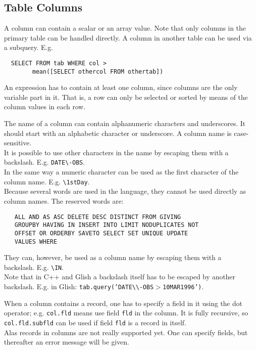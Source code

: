 \subsection{\label{TAQL:COLUMNS}Table Columns}
A column can contain a scalar or an array value.
Note that only columns in the primary table can be handled directly.
A column in another table can be used via a subquery. E.g.
\begin{verbatim}
  SELECT FROM tab WHERE col >
        mean([SELECT othercol FROM othertab])
\end{verbatim}
An expression has to contain at least one column, since columns
are the only variable part in it. That is, a row can only be selected
or sorted by means of the column values in each row.

The name of a column can contain alphanumeric characters and underscores.
It should start with an alphabetic character or underscore.
A column name is case-sensitive.
\\It is possible to use other characters in the name by
escaping them with a backslash. E.g. \texttt{DATE}\verb+\+\texttt{-OBS}.
\\In the same way a numeric character can be used as the first
character of the column name. E.g. \verb+\+\texttt{1stDay}.
\\
Because several words are used in the language, they cannot
be used directly as column names. The reserved words are:
\begin{verbatim}
   ALL AND AS ASC DELETE DESC DISTINCT FROM GIVING
   GROUPBY HAVING IN INSERT INTO LIMIT NODUPLICATES NOT
   OFFSET OR ORDERBY SAVETO SELECT SET UNIQUE UPDATE
   VALUES WHERE
\end{verbatim}
They can, however, be used as a column name by escaping
them with a backslash. E.g. \verb+\+\texttt{IN}.
\\Note that in C++ and Glish a backslash itself has to be escaped
by another backslash. E.g. in Glish:
\texttt{tab.query('DATE}\verb+\\+\texttt{-OBS$>$10MAR1996')}.

When a column contains a record, one has to specify a field in it
using the dot operator; e.g. \texttt{col.fld} means use field
\texttt{fld} in the column. It is fully recursive, so
\texttt{col.fld.subfld} can be used if field \texttt{fld} is a record
in itself.
\\Alas records in columns are not really supported yet. One can specify
fields, but thereafter an error message will be given.


